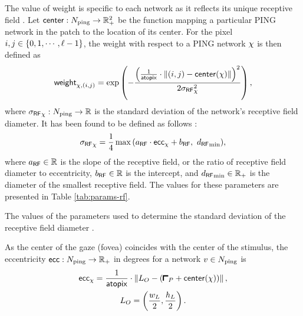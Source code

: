 The value of weight is specific to each network as it reflects its unique receptive field \cite{MaryamPLACEHOLDER}. Let $\mathsf{center} : N_{\mathrm{ping}} \to \mathbb{R}_+^2$ be the function mapping a particular PING network in the patch to the location of its center. For the pixel $i, j \in \{ 0, 1, \cdots, \ell - 1 \}$, the weight with respect to a PING network $\chi$ is then defined as
\begin{equation}
    \mathsf{weight}_{\chi, (i, j)} = \exp \left(
        -\frac{\left( \frac{1}{\mathsf{atopix}} \cdot \| (i, j) - \mathsf{center}(\chi) \|\right)^2}{ 2 {\sigma_\mathsf{RF}}_\chi^2 }
    \right),
    \label{eq:weight-pixel-network}
\end{equation}
where ${\sigma_\mathsf{RF}}_\chi: N_{\mathrm{ping}} \to \mathbb{R}$ is 
the standard deviation of the network's receptive field diameter. It has been found to be defined as follows \cite{Freeman2011, MaryamPLACEHOLDER}:  
\begin{equation}
    {\sigma_\mathsf{RF}}_\chi = \frac{1}{4} \max{( a_\mathsf{RF}\cdot \mathsf{ecc}_\chi+ b_\mathsf{RF}, \ {d_\mathsf{RF}}_{\min} )},
\end{equation}
where $a_\mathsf{RF} \in \mathbb{R}$ is the slope of the receptive field, or the ratio of receptive field diameter to eccentricity, $b_\mathsf{RF} \in \mathbb{R}$ is the intercept, and ${d_\mathsf{RF}}_{\min} \in \mathbb{R}_+$ is the diameter of the smallest receptive field. The values for these parameters are presented in Table \ref{tab:params-rf}.

\begin{table}[!htp]
    \centering
    
    \caption{The values of the parameters used to determine the standard deviation of the receptive field diameter \cite{MaryamPLACEHOLDER}.}
    \label{tab:params-rf}
\end{table}

As the center of the gaze (fovea) coincides with the center of the stimulus, the eccentricity $\mathsf{ecc}: N_{\mathrm{ping}} \to \mathbb{R}_+$ in degrees for a network $v \in N_{\mathrm{ping}}$ is
\begin{equation}
\begin{gathered}
    \ecc_{\pingnet} = \frac{1}{\atopix} \cdot \left\| \stimcenter - (\patchstart + \centr(\pingnet)) \right\|, \\
    \stimcenter = \left( \frac{\fullwidth}{2}, \frac{\fullheight}{2} \right).
\end{gathered}
\end{equation}